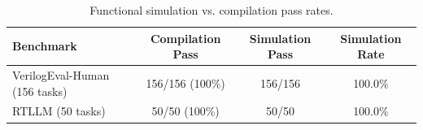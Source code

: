 
\begin{table}[!t]
\centering
\caption{Functional simulation vs. compilation pass rates.}
\label{tab:functional}
\begin{tabular}{lccc}
\toprule
Benchmark & Compilation Pass & Simulation Pass & Simulation Rate \\
\midrule
VerilogEval-Human (156 tasks) & 156/156 (100\%) & 156/156 & 100.0\% \\
RTLLM (50 tasks) & 50/50 (100\%) & 50/50 & 100.0\% \\
\bottomrule
\end{tabular}
\end{table}
